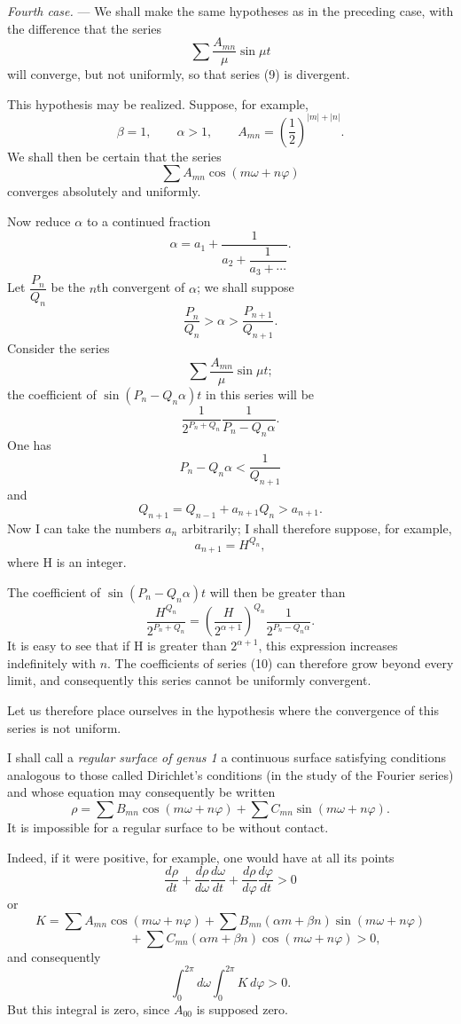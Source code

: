\documentclass[11pt]{article}
\begin{document}
\emph{Fourth case.} — We shall make the same hypotheses as in the preceding case, with the difference that the series
\[
\sum \frac{A_{mn}}{\mu}\sin\mu t
\]
will converge, but not uniformly, so that series (9) is divergent.

This hypothesis may be realized. Suppose, for example,
\[
\beta=1,
\qquad
\alpha>1,
\qquad
A_{mn}=\left(\frac12\right)^{|m|+|n|}.
\]
We shall then be certain that the series
\[
\sum A_{mn}\cos(m\omega+n\varphi)
\]
converges absolutely and uniformly.

Now reduce $\alpha$ to a continued fraction
\[
\alpha=a_1+\frac1{a_2+\dfrac1{a_3+\cdots}}.
\]
Let $\dfrac{P_n}{Q_n}$ be the $n$th convergent of $\alpha$; we shall suppose
\[
\frac{P_n}{Q_n}>\alpha>\frac{P_{n+1}}{Q_{n+1}}.
\]
Consider the series
\begin{equation}
\sum \frac{A_{mn}}{\mu}\sin\mu t;
\tag{10}
\end{equation}
the coefficient of $\sin(P_n-Q_n\alpha)t$ in this series will be
\[
\frac1{2^{P_n+Q_n}}\frac1{P_n-Q_n\alpha}.
\]
One has
\[
P_n-Q_n\alpha<\frac1{Q_{n+1}}
\]
and
\[
Q_{n+1}=Q_{n-1}+a_{n+1}Q_n>a_{n+1}.
\]
Now I can take the numbers $a_n$ arbitrarily; I shall therefore suppose, for example,
\[
a_{n+1}=H^{Q_n},
\]
where H is an integer.

The coefficient of $\sin(P_n-Q_n\alpha)t$ will then be greater than
\[
\frac{H^{Q_n}}{2^{P_n+Q_n}}=\left(\frac{H}{2^{\alpha+1}}\right)^{Q_n}\frac1{2^{P_n-Q_n\alpha}}.
\]
It is easy to see that if H is greater than $2^{\alpha+1}$, this expression increases indefinitely with $n$. The coefficients of series (10) can therefore grow beyond every limit, and consequently this series cannot be uniformly convergent.

Let us therefore place ourselves in the hypothesis where the convergence of this series is not uniform.

I shall call a \emph{regular surface of genus 1} a continuous surface satisfying conditions analogous to those called Dirichlet’s conditions (in the study of the Fourier series) and whose equation may consequently be written
\[
\rho=\sum B_{mn}\cos(m\omega+n\varphi)+\sum C_{mn}\sin(m\omega+n\varphi).
\]
It is impossible for a regular surface to be without contact.

Indeed, if it were positive, for example, one would have at all its points
\[
\frac{d\rho}{dt}+\frac{d\rho}{d\omega}\frac{d\omega}{dt}+\frac{d\rho}{d\varphi}\frac{d\varphi}{dt}>0
\]
or
\[
K=\sum A_{mn}\cos(m\omega+n\varphi)+\sum B_{mn}(\alpha m+\beta n)\sin(m\omega+n\varphi)
\]
\[
\hspace{4em}+\sum C_{mn}(\alpha m+\beta n)\cos(m\omega+n\varphi)>0,
\]
and consequently
\[
\int_0^{2\pi}d\omega\int_0^{2\pi}K\,d\varphi>0.
\]
But this integral is zero, since $A_{00}$ is supposed zero.
\end{document}
